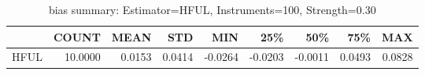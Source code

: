 \begin{table}[ht]
\centering
\caption{bias summary: Estimator=HFUL, Instruments=100, Strength=0.30}
\begin{tabular}{lrrrrrrrr}
\toprule
 & COUNT & MEAN & STD & MIN & 25\% & 50\% & 75\% & MAX \\
\midrule
HFUL & 10.0000 & 0.0153 & 0.0414 & -0.0264 & -0.0203 & -0.0011 & 0.0493 & 0.0828 \\
\bottomrule
\end{tabular}
\end{table}
